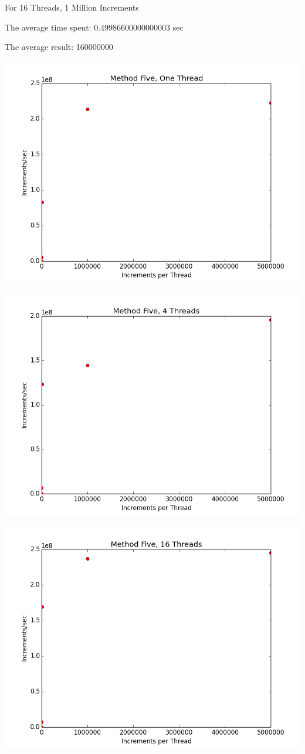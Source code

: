 \documentclass[12pt]{article}
\begin{document}
For 16 Threads, 1 Million Increments

The average time spent: 0.49986600000000003 sec

The average result: 160000000

\includegraphics[scale=.5]{Graphs/MethodFive_1Thread.png}

\includegraphics[scale=.5]{Graphs/MethodFive_4Thread.png}

\includegraphics[scale=.5]{Graphs/MethodFive_16Thread.png}
\end{document}
